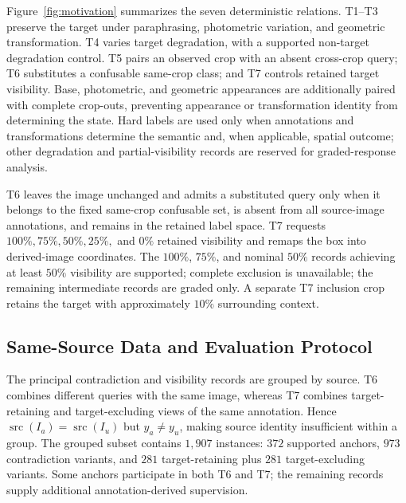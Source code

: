 \documentclass[letterpaper]{article}
\begin{document}
Figure~\ref{fig:motivation} summarizes the seven deterministic relations. T1--T3 preserve the target under paraphrasing, photometric variation, and geometric transformation. T4 varies target degradation, with a supported non-target degradation control. T5 pairs an observed crop with an absent cross-crop query; T6 substitutes a confusable same-crop class; and T7 controls retained target visibility. Base, photometric, and geometric appearances are additionally paired with complete crop-outs, preventing appearance or transformation identity from determining the state. Hard labels are used only when annotations and transformations determine the semantic and, when applicable, spatial outcome; other degradation and partial-visibility records are reserved for graded-response analysis.

T6 leaves the image unchanged and admits a substituted query only when it belongs to the fixed same-crop confusable set, is absent from all source-image annotations, and remains in the retained label space. T7 requests $100\%,75\%,50\%,25\%,$ and $0\%$ retained visibility and remaps the box into derived-image coordinates. The $100\%$, $75\%$, and nominal $50\%$ records achieving at least $50\%$ visibility are supported; complete exclusion is unavailable; the remaining intermediate records are graded only. A separate T7 inclusion crop retains the target with approximately $10\%$ surrounding context. %

\subsection{Same-Source Data and Evaluation Protocol}
\label{sec:data_protocol}
\label{sec:pairing}
\label{sec:composition}
\label{sec:probes}

The principal contradiction and visibility records are grouped by source. T6 combines different queries with the same image, whereas T7 combines target-retaining and target-excluding views of the same annotation. Hence $\operatorname{src}(I_a)=\operatorname{src}(I_u)$ but $y_a\neq y_u$, making source identity insufficient within a group. The grouped subset contains $1{,}907$ instances: $372$ supported anchors, $973$ contradiction variants, and $281$ target-retaining plus $281$ target-excluding variants. Some anchors participate in both T6 and T7; the remaining records supply additional annotation-derived supervision.
\end{document}
